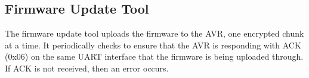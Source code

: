 \documentclass[11pt]{article}
\begin{document}
\subsection{Firmware Update Tool}
The firmware update tool uploads the firmware to the AVR, one encrypted chunk at a time. It periodically checks to ensure that the AVR is responding with ACK (0x06) on the same UART interface that the firmware is being uploaded through. If ACK is not received, then an error occurs.
\end{document}

